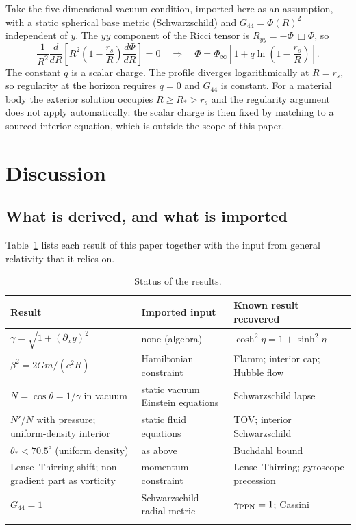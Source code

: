 \documentclass[pdflatex,sn-mathphys-num]{sn-jnl}%
\theoremstyle{thmstyleone}%
\theoremstyle{thmstyletwo}%
\theoremstyle{thmstylethree}%
\begin{document}
Take the five-dimensional vacuum condition, imported here as an assumption, with a static spherical base metric (Schwarzschild) and $G_{44}=\Phi(R)^2$ independent of $y$. The $yy$ component of the Ricci tensor is $R_{yy}=-\Phi\,\Box\Phi$, so
\begin{equation}
    \frac1{R^2}\frac{d}{dR}\!\left[R^2\left(1-\frac{r_s}{R}\right)\frac{d\Phi}{dR}\right]=0
    \quad\Rightarrow\quad
    \Phi=\Phi_\infty\left[1+q\ln\left(1-\frac{r_s}{R}\right)\right].
\end{equation}
The constant $q$ is a scalar charge. The profile diverges logarithmically at $R=r_s$, so regularity at the horizon requires $q=0$ and $G_{44}$ is constant. For a material body the exterior solution occupies $R\ge R_*>r_s$ and the regularity argument does not apply automatically: the scalar charge is then fixed by matching to a sourced interior equation, which is outside the scope of this paper.

\section{Discussion}\label{sec_discussion}

\subsection{What is derived, and what is imported}

Table~\ref{table_status} lists each result of this paper together with the input from general relativity that it relies on.

\begin{table}[t]
\caption{Status of the results.}\label{table_status}
\begin{tabular}{@{}p{}p{}p{}@{}}
\toprule
Result & Imported input & Known result recovered\\
\midrule
$\gamma=\sqrt{1+(\partial_xy)^2}$ & none (algebra) & $\cosh^2\eta=1+\sinh^2\eta$\\
$\beta^2=2Gm/(c^2R)$ & Hamiltonian constraint & Flamm; interior cap; Hubble flow\\
$N=\cos\theta=1/\gamma$ in vacuum & static vacuum Einstein equations & Schwarzschild lapse\\
$N'/N$ with pressure; uniform-density interior & static fluid equations & TOV; interior Schwarzschild\\
$\theta_*<70.5^\circ$ (uniform density) & as above & Buchdahl bound\\
Lense--Thirring shift; non-gradient part as vorticity & momentum constraint & Lense--Thirring; gyroscope precession\\
$G_{44}=1$ & Schwarzschild radial metric & $\gamma_{\rm PPN}=1$; Cassini\\
\botrule
\end{tabular}
\end{table}
\end{document}
